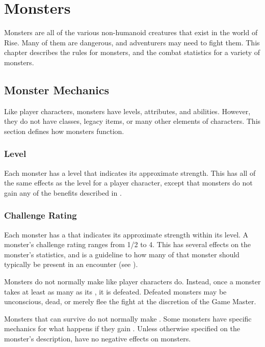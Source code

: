 \chapter{Monsters}

Monsters are all of the various non-humanoid creatures that exist in the world of Rise.
Many of them are dangerous, and adventurers may need to fight them.
This chapter describes the rules for monsters, and the combat statistics for a variety of monsters.

\section{Monster Mechanics}
    Like player characters, monsters have levels, attributes, and abilities.
    However, they do not have classes, legacy items, or many other elements of characters.
    This section defines how monsters function.

    \subsection{Level}
        Each monster has a level that indicates its approximate strength.
        This has all of the same effects as the level for a player character, except that monsters do not gain any of the benefits described in .

    \subsection{Challenge Rating}\label{Challenge Rating}
        Each monster has a  that indicates its approximate strength within its level.
        A monster's challenge rating ranges from 1/2 to 4.
        This has several effects on the monster's statistics, and is a guideline to how many of that monster should typically be present in an encounter (see ).

         Monsters do not normally make  like player characters do.
        Instead, once a monster takes at least as many  as its , it is defeated.
        Defeated monsters may be unconscious, dead, or merely flee the fight at the discretion of the Game Master.

        Monsters that can survive  do not normally make .
        Some monsters have specific mechanics for what happens if they gain .
        Unless otherwise specified on the monster's description,  have no negative effects on monsters.

